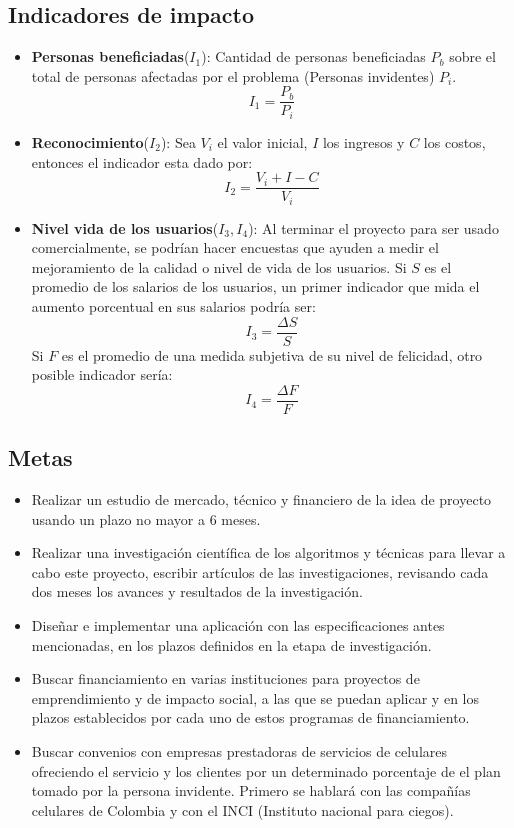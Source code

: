 \documentclass[a4paper, 12pt, oneside]{article}
\begin{document}
	\subsection{Indicadores de impacto}
	\begin{itemize}
		\item {\bf Personas beneficiadas}($I_1$): Cantidad de personas beneficiadas $P_b$ sobre el total
			de personas afectadas por el problema (Personas invidentes) $P_i$.
			\[I_1 = \frac{P_b}{P_i}\]
		\item {\bf Reconocimiento}($I_2$): Sea $V_i$ el valor inicial, $I$ los ingresos y $C$ los costos, entonces
			el indicador esta dado por:
			\[I_2 = \frac{V_i+I-C}{V_i}\]
		\item {\bf Nivel vida de los usuarios}($I_3,I_4$): Al terminar el proyecto para ser usado comercialmente,
			se podrían hacer encuestas que ayuden a medir el mejoramiento de la calidad o nivel de vida de los usuarios.
			Si $S$ es el promedio de los salarios de los usuarios, un primer indicador que mida el aumento porcentual
			en sus salarios podría ser:
			\[I_3 = \frac{\Delta S}{S}\]
			Si $F$ es el promedio de una medida subjetiva de su nivel de felicidad, otro posible indicador sería:
			\[I_4 = \frac{\Delta F}{F}\]
	\end{itemize}
	
	\subsection{Metas}
	\begin{itemize}
	\item Realizar un estudio de mercado, técnico y financiero de la idea de proyecto usando
		un plazo no mayor a 6 meses.
	\item Realizar una investigación científica de los algoritmos y técnicas para llevar a cabo este proyecto,
		escribir artículos de las investigaciones, revisando cada dos meses los avances y resultados de la
		investigación.
	\item Diseñar e implementar una aplicación con las especificaciones antes mencionadas, en los plazos
	definidos en la etapa de investigación.
	\item Buscar financiamiento en varias instituciones para proyectos de emprendimiento y
	 de impacto social, a las que se puedan aplicar y en los plazos establecidos por cada uno de estos
	 programas de financiamiento.
	\item Buscar convenios con empresas prestadoras de servicios de celulares ofreciendo el servicio
	 y los clientes por un determinado porcentaje de el plan tomado por la persona invidente. Primero
	 se hablará con las compañías celulares de Colombia y con el INCI (Instituto nacional para ciegos).
	\end{itemize}
	
\end{document}
